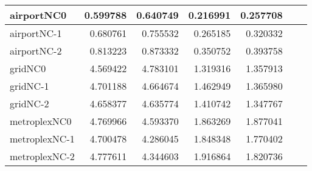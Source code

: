 \begin{longtable}{|l|r|r|r|r|r|r|}
airportNC0 & 0.599788 & 0.640749 & 0.216991 & 0.257708 \\ \hline
airportNC-1 & 0.680761 & 0.755532 & 0.265185 & 0.320332 \\ \hline
airportNC-2 & 0.813223 & 0.873332 & 0.350752 & 0.393758 \\ \hline
gridNC0 & 4.569422 & 4.783101 & 1.319316 & 1.357913 \\ \hline
gridNC-1 & 4.701188 & 4.664674 & 1.462949 & 1.365980 \\ \hline
gridNC-2 & 4.658377 & 4.635774 & 1.410742 & 1.347767 \\ \hline
metroplexNC0 & 4.769966 & 4.593370 & 1.863269 & 1.877041 \\ \hline
metroplexNC-1 & 4.700478 & 4.286045 & 1.848348 & 1.770402 \\ \hline
metroplexNC-2 & 4.777611 & 4.344603 & 1.916864 & 1.820736 \\ \hline
\end{longtable}
